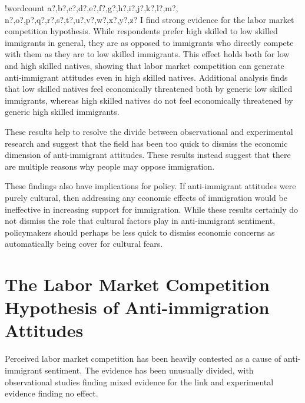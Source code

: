 \documentclass{article}\usepackage[]{graphicx}\usepackage[]{color}
\newcounter{words}
\newenvironment{counted}{%
\setcounter{words}{0}
\SearchList!{wordcount}{\stepcounter{words}}
{a?,b?,c?,d?,e?,f?,g?,h?,i?,j?,k?,l?,m?,
n?,o?,p?,q?,r?,s?,t?,u?,v?,w?,x?,y?,z?}
\UndoBoundary{'}
\SearchOrder{p;}}{%
\StopSearching}
\begin{document}
\begin{counted}
I find strong evidence for the labor market competition hypothesis. While respondents prefer high skilled to low skilled immigrants in general, they are as opposed to immigrants who directly compete with them as they are to low skilled immigrants. This effect holds both for low and high skilled natives, showing that labor market competition can generate anti-immigrant attitudes even in high skilled natives. Additional analysis finds that low skilled natives feel economically threatened both by generic low skilled immigrants, whereas high skilled natives do not feel economically threatened by generic high skilled immigrants.

These results help to resolve the divide between observational and experimental research and suggest that the field has been too quick to dismiss the economic dimension of anti-immigrant attitudes. These results instead suggest that there are multiple reasons why people may oppose immigration.











These findings also have implications for policy. If anti-immigrant attitudes were purely cultural, then addressing any economic effects of immigration would be ineffective in increasing support for immigration. While these results certainly do not dismiss the role that cultural factors play in anti-immigrant sentiment, policymakers should perhaps be less quick to dismiss economic concerns as automatically being cover for cultural fears. 



\section{The Labor Market Competition Hypothesis of Anti-immigration Attitudes}

Perceived labor market competition has been heavily contested as a cause of anti-immigrant sentiment. The evidence has been unusually divided, with observational studies finding mixed evidence for the link and experimental evidence finding no effect. 


\end{counted}
\end{document}
